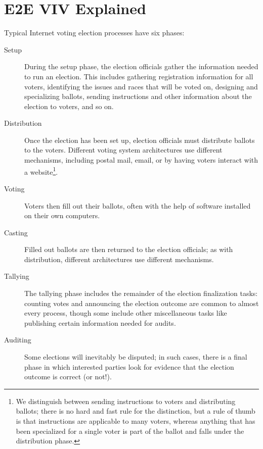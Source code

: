 \chapter{E2E VIV Explained}
\label{chapter:e2e_viv_explained}


Typical Internet voting election processes have six phases:

\begin{description}
  \item[Setup] During the setup phase, the election officials gather the
    information needed to run an election. This includes gathering
    registration information for all voters, identifying the issues and
    races that will be voted on, designing and specializing ballots,
    sending instructions and other information about the election to voters,
    and so on.
  \item[Distribution] Once the election has been set up, election officials
    must distribute ballots to the voters. Different voting system
    architectures use different mechanisms, including postal mail, email, or
    by having voters interact with a website\footnote{We distinguish between
    sending instructions to voters and distributing ballots; there is no
    hard and fast rule for the distinction, but a rule of thumb is that
    instructions are applicable to many voters, whereas anything that has
    been specialized for a single voter is part of the ballot and falls
    under the distribution phase.}.
  \item[Voting] Voters then fill out their ballots, often with the help of
    software installed on their own computers.
  \item[Casting] Filled out ballots are then returned to the election
    officials; as with distribution, different architectures use different
    mechanisms.
  \item[Tallying] The tallying phase includes the remainder of the election
    finalization tasks: counting votes and announcing the election outcome
    are common to almost every process, though some include other
    miscellaneous tasks like publishing certain information needed for
    audits.
  \item[Auditing] Some elections will inevitably be disputed; in such cases,
    there is a final phase in which interested parties look for evidence
    that the election outcome is correct (or not!).
\end{description}

